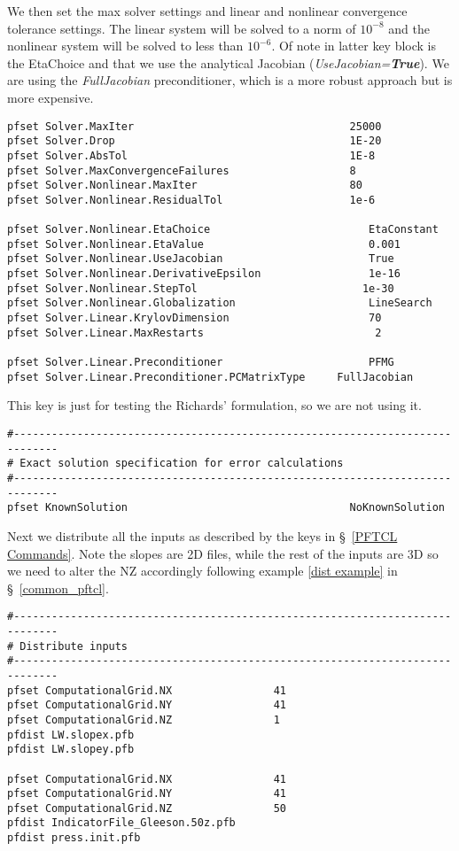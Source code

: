 We then set the max solver settings and linear and nonlinear convergence
tolerance settings. The linear system will be solved to a norm of $10^{-8}$ and 
the nonlinear system will be solved to less than $10^{-6}$. Of note in latter key block 
is the EtaChoice and that we use the analytical Jacobian (\emph{UseJacobian=\bf{True}}).
We are using the \emph{FullJacobian} preconditioner, which is a more robust approach
but is more expensive.
\begin{verbatim}
pfset Solver.MaxIter                                  25000
pfset Solver.Drop                                     1E-20
pfset Solver.AbsTol                                   1E-8
pfset Solver.MaxConvergenceFailures                   8
pfset Solver.Nonlinear.MaxIter                        80
pfset Solver.Nonlinear.ResidualTol                    1e-6

pfset Solver.Nonlinear.EtaChoice                         EtaConstant
pfset Solver.Nonlinear.EtaValue                          0.001
pfset Solver.Nonlinear.UseJacobian                       True 
pfset Solver.Nonlinear.DerivativeEpsilon                 1e-16
pfset Solver.Nonlinear.StepTol				 			1e-30
pfset Solver.Nonlinear.Globalization                     LineSearch
pfset Solver.Linear.KrylovDimension                      70
pfset Solver.Linear.MaxRestarts                           2

pfset Solver.Linear.Preconditioner                       PFMG
pfset Solver.Linear.Preconditioner.PCMatrixType     FullJacobian
\end{verbatim}

This key is just for testing the Richards' formulation, so we are not using it.

\begin{verbatim}
#-----------------------------------------------------------------------------
# Exact solution specification for error calculations
#-----------------------------------------------------------------------------
pfset KnownSolution                                   NoKnownSolution
\end{verbatim}

Next we distribute all the inputs as described by the keys in \S~\ref{PFTCL Commands}.  Note the slopes 
are 2D files, while the rest of the \parflow{} inputs are 3D so we need to alter the NZ accordingly
following example \ref{dist example} in \S~\ref{common_pftcl}.

\begin{verbatim}
#-----------------------------------------------------------------------------
# Distribute inputs
#-----------------------------------------------------------------------------
pfset ComputationalGrid.NX                41 
pfset ComputationalGrid.NY                41 
pfset ComputationalGrid.NZ                1
pfdist LW.slopex.pfb
pfdist LW.slopey.pfb

pfset ComputationalGrid.NX                41 
pfset ComputationalGrid.NY                41 
pfset ComputationalGrid.NZ                50 
pfdist IndicatorFile_Gleeson.50z.pfb
pfdist press.init.pfb
\end{verbatim}

